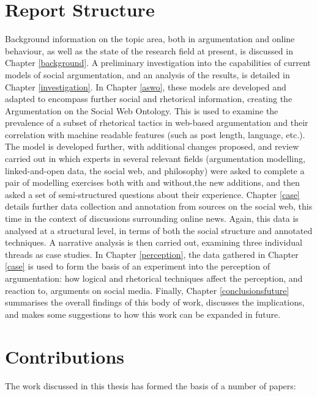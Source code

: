 \section{Report Structure}
Background information on the topic area, both in argumentation and online behaviour, as well as the state of the research field at present, is discussed in Chapter \ref{background}.
A preliminary investigation into the capabilities of current models of social argumentation, and an analysis of the results, is detailed in Chapter \ref{investigation}.
In Chapter \ref{aswo}, these models are developed and adapted to encompass further social and rhetorical information, creating the Argumentation on the Social Web Ontology. This is used to examine the prevalence of a subset of rhetorical tactics in web-based argumentation and their correlation with machine readable features (such as post length, language, etc.). The model is developed further, with additional changes proposed, and review carried out in which experts in several relevant fields (argumentation modelling, linked-and-open data, the social web, and philosophy) were asked to complete a pair of modelling exercises both with and without,the new additions, and then asked a set of semi-structured questions about their experience.
Chapter \ref{case} details further data collection and annotation from sources on the social web, this time in the context of discussions surrounding online news. Again, this data is analysed at a structural level, in terms of both the social structure and annotated techniques. A narrative analysis is then carried out, examining three individual threads as case studies.
In Chapter \ref{perception}, the data gathered in Chapter \ref{case} is used to form the basis of an experiment into the perception of argumentation: how logical and rhetorical techniques affect the perception, and reaction to, arguments on social media.
Finally, Chapter \ref{conclusionsfuture} summarises the overall findings of this body of work, discusses the implications, and makes some suggestions to how this work can be expanded in future.


\section{Contributions}
The work discussed in this thesis has formed the basis of a number of papers:

